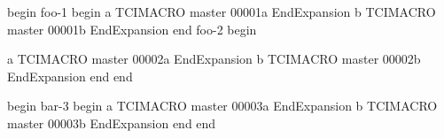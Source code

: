 begin
foo-1
begin
a
TCIMACRO
master 00001a
EndExpansion
b
TCIMACRO
master 00001b
EndExpansion
end
foo-2
begin

a
TCIMACRO
master 00002a
EndExpansion
b
TCIMACRO
master 00002b
EndExpansion
end
end

begin
bar-3
begin
a
TCIMACRO
master 00003a
EndExpansion
b
TCIMACRO
master 00003b
EndExpansion
end
end
